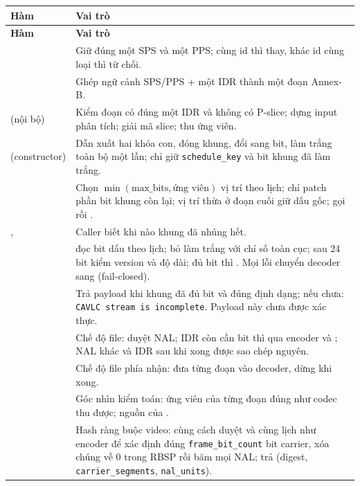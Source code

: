 \documentclass[11pt,a4paper]{article}
\begin{document}
\begin{longtable}{P{.36\textwidth}P{.55\textwidth}}
\toprule\textbf{Hàm} & \textbf{Vai trò} \\
\midrule\endfirsthead
\toprule\textbf{Hàm} & \textbf{Vai trò} \\
\midrule\endhead
{} & Giữ đúng một SPS và một PPS; cùng id thì thay, khác id cùng loại thì từ chối. \\
 & Ghép ngữ cảnh SPS/PPS + một IDR thành một đoạn Annex-B. \\
 (nội bộ) & Kiểm đoạn có đúng một IDR và không có P-slice; dựng input phân tích; giải mã slice; thu ứng viên. \\
 (constructor) & Dẫn xuất hai khóa con, đóng khung, đổi sang bit, làm trắng toàn bộ một lần; chỉ giữ \texttt{schedule\_key} và bit khung đã làm trắng. \\
\allowbreak{} & Chọn $\min(\text{max\_bits}, \text{ứng viên})$ vị trí theo lịch; chỉ patch phần bit khung còn lại; vị trí thừa ở đoạn cuối giữ dấu gốc; gọi  rồi . \\
,  & Caller biết khi nào khung đã nhúng hết. \\
\allowbreak{} &  đọc bit dấu theo lịch; bỏ làm trắng với chỉ số toàn cục; sau 24 bit kiểm version và độ dài; đủ bit thì . Mọi lỗi chuyển decoder sang  (fail-closed). \\
 & Trả payload khi khung đã đủ bit và đúng định dạng; nếu chưa: \texttt{CAVLC stream is incomplete}. Payload này chưa được xác thực. \\
 & Chế độ file:  duyệt NAL; IDR còn cần bit thì qua encoder và ; NAL khác và IDR sau khi xong được sao chép nguyên. \\
 & Chế độ file phía nhận: đưa từng đoạn vào decoder, dừng khi xong. \\
 & Góc nhìn kiểm toán: ứng viên của từng đoạn đúng như codec thu được; nguồn của . \\
 & Hash ràng buộc video: cùng cách duyệt và cùng lịch như encoder để xác định đúng \texttt{frame\_bit\_count} bit carrier, xóa chúng về 0 trong RBSP rồi băm mọi NAL; trả  (digest, \texttt{carrier\_segments}, \texttt{nal\_units}). \\
\bottomrule\end{longtable}
\end{document}
